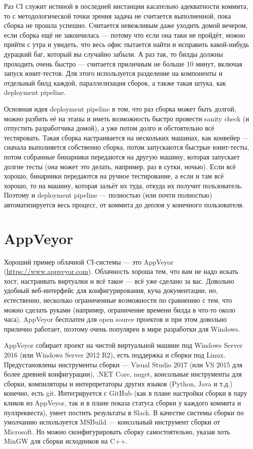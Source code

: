 \documentclass[a5paper]{article}
\begin{document}
Раз CI служит истиной в последней инстанции касательно адекватности коммита, то с методологической точки зрения задача не считается выполненной, пока сборка не прошла успешно. Считается невежливым даже уходить домой вечером, если сборка ещё не закончилась --- потому что если она таки не пройдёт, можно прийти с утра и увидеть, что весь офис пытается найти и исправить какой-нибудь дурацкий баг, который вы случайно забыли. А раз так, то билды должны проходить очень быстро --- считается приличным не больше 10 минут, включая запуск юнит-тестов. Для этого используется разделение на компоненты и отдельный билд каждой, параллелизация сборок, а также такая штука, как deployment pipeline.

Основная идея deployment pipeline в том, что раз сборка может быть долгой, можно разбить её на этапы и иметь возможность быстро провести sanity check (и отпустить разработчика домой), а уже потом долго и обстоятельно всё тестировать. Такая сборка настраивается на нескольких машинах, как конвейер --- сначала выполняется собственно сборка, потом запускаются быстрые юнит-тесты, потом собранные бинарники передаются на другую машину, которая запускает долгие тесты (она может это делать, например, раз в сутки, ночью). Если всё хорошо, бинарники передаются на ручное тестирование, а если и там всё хорошо, то на машину, которая зальёт их туда, откуда их получит пользователь. Поэтому и deployment pipeline --- полностью (или почти полностью) автоматизируется весь процесс, от коммита до деплоя у конечного пользователя.

\section{AppVeyor}

Хороший пример облачной CI-системы --- это AppVeyor (\url{https://www.appveyor.com}). Облачность хороша тем, что вам не надо искать хост, настраивать виртуалки и всё такое --- всё уже сделано за вас. Довольно удобный веб-интерфейс для конфигурирования, куча документации, но, естественно, несколько ограниченные возможности по сравнению с тем, что можно сделать руками (например, ограничение времени билда в что-то около часа). AppVeyor бесплатен для open source проектов и при этом довольно прилично работает, поэтому очень популярен в мире разработки для Windows.

AppVeyor собирает проект на чистой виртуальной машине под Windows Server 2016 (или Windows Server 2012 R2), есть поддержка и сборки под Linux. Предустановлены инструменты сборки --- Visual Studio 2017 (или VS 2015 для более древней конфигурации), .NET Core, nuget, консольные инструменты для сборки, компиляторы и интерпретаторы других языков (Python, Java и т.д.) конечно, есть git. Интегрируется с GitHub (как в плане настройки сборки в пару кликов из AppVeyor, так и в плане показа статуса сборки у каждого коммита и пуллреквеста), умеет постить результаты в Slack. В качестве системы сборки по умолчанию используется MSBuild --- консольный инструмент сборки от Microsoft. Но можно сконфигурировать сборку самостоятельно, указав хоть MinGW для сборки исходников на C++.
\end{document}
